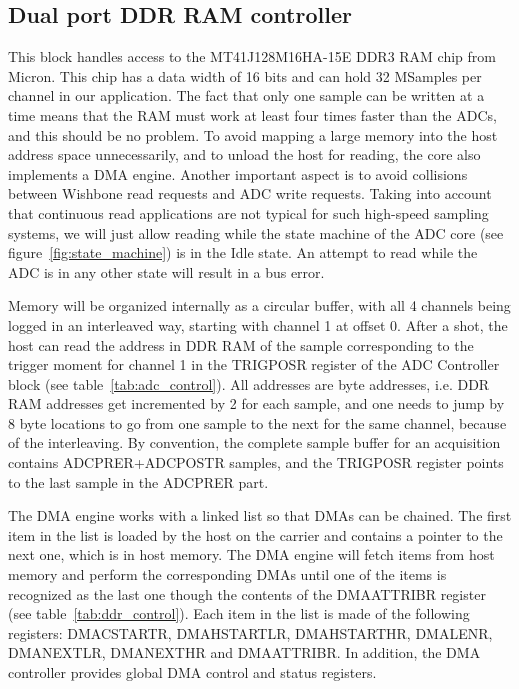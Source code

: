 \documentclass{article}
\begin{document}
\subsection{Dual port DDR RAM controller}
This block handles access to the MT41J128M16HA-15E DDR3 RAM chip from Micron. This chip has a data width of 16 bits and can hold 32 MSamples per channel in our application. The fact that only one sample can be written at a time means that the RAM must work at least four times faster than the ADCs, and this should be no problem. To avoid mapping a large memory into the host address space unnecessarily, and to unload the host for reading, the core also implements a DMA engine. Another important aspect is to avoid collisions between Wishbone read requests and ADC write requests. Taking into account that continuous read applications are not typical for such high-speed sampling systems, we will just allow reading while the state machine of the ADC core (see figure~\ref{fig:state_machine}) is in the Idle state. An attempt to read while the ADC is in any other state will result in a bus error.

Memory will be organized internally as a circular buffer, with all 4 channels being logged in an interleaved way, starting with channel 1 at offset 0. After a shot, the host can read the address in DDR RAM of the sample corresponding to the trigger moment for channel 1 in the TRIGPOSR register of the ADC Controller block (see table~\ref{tab:adc_control}). All addresses are byte addresses, i.e. DDR RAM addresses get incremented by 2 for each sample, and one needs to jump by 8 byte locations to go from one sample to the next for the same channel, because of the interleaving. By convention, the complete sample buffer for an acquisition contains ADCPRER+ADCPOSTR samples, and the TRIGPOSR register points to the last sample in the ADCPRER part. 

The DMA engine works with a linked list so that DMAs can be chained. The first item in the list is loaded by the host on the carrier and contains a pointer to the next one, which is in host memory. The DMA engine will fetch items from host memory and perform the corresponding DMAs until one of the items is recognized as the last one though the contents of the DMAATTRIBR register (see table~\ref{tab:ddr_control}). Each item in the list is made of the following registers: DMACSTARTR, DMAHSTARTLR, DMAHSTARTHR, DMALENR, DMANEXTLR, DMANEXTHR and DMAATTRIBR. In addition, the DMA controller provides global DMA control and status registers. 
\end{document}
